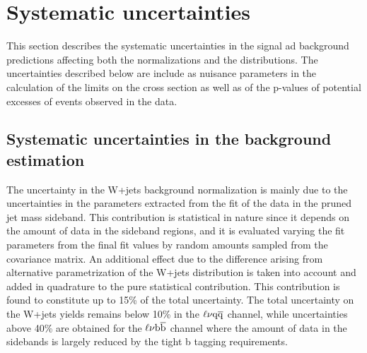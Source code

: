 \section{Systematic uncertainties}\label{sec:systUnc}

This section describes the systematic uncertainties in the signal ad background predictions affecting both the normalizations and the \mlvj distributions.
The uncertainties described below are include as nuisance parameters in the calculation of the limits on the cross section as well as of the p-values of potential excesses of events
observed in the data. %

\subsection{Systematic uncertainties in the background estimation}\label{subsec:uncBkg}

The uncertainty in the W+jets background normalization is mainly due to the uncertainties in the parameters extracted from the fit of the data in the pruned jet mass sideband. This contribution is statistical in nature since it depends on the amount of data in the \mJ sideband regions, and it is evaluated varying the fit parameters from the final fit values by random amounts sampled from the covariance matrix.
An additional effect due to the difference arising from alternative parametrization of the W+jets \mJ distribution is taken into account and added in quadrature to the pure statistical contribution. This contribution is found to constitute up to 15\% of the total uncertainty. The total uncertainty on the W+jets yields remains below 10\% in the $\ell\nu\mathrm{q}\overline{\mathrm{q}}$ channel, while uncertainties above 40\% are obtained for the $\ell\nu{\mathrm{b}\overline{\mathrm{b}}}$ channel where the amount of data in the sidebands is largely reduced by the tight b tagging requirements.

